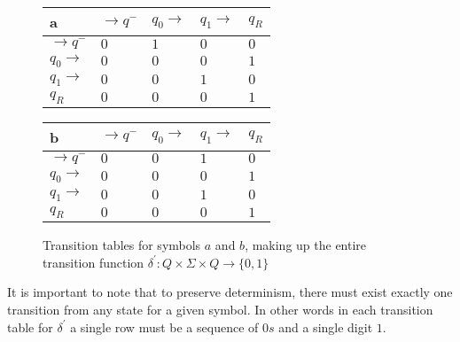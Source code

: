 \documentclass[runningheads,a4paper]{llncs}
\begin{document}
\begin{figure}
\begin{center}

	\setlength{\tabcolsep}{4pt}
	\renewcommand{\arraystretch}{1.4}

	\begin{tabular}{|P{1.0cm} || P{0.8cm} | P{0.8cm} | P{0.8cm} | P{0.8cm}|}
	\hline
	a & $\rightarrow q^-$ & $q_0 \rightarrow$ & $q_1 \rightarrow$ & $q_R$ \\
	\hline
	\hline
	$\rightarrow q^-$ 		& $0$ & $1$ & $0$ & $0$ \\
	\hline
	$q_0 \rightarrow$ 		& $0$ & $0$ & $0$ & $1$ \\
	\hline
	$q_1 \rightarrow$ 		& $0$ & $0$ & $1$ & $0$ \\
	\hline
	$q_R$  					& $0$ & $0$ & $0$ & $1$ \\
	\hline
	
	\end{tabular}
	\hspace*{1 cm}
	\begin{tabular}{|P{1.0cm} || P{0.8cm} | P{0.8cm} | P{0.8cm} | P{0.8cm}|}
	\hline
	b & $\rightarrow q^-$ & $q_0 \rightarrow$ & $q_1 \rightarrow$ & $q_R$ \\
	\hline
	\hline
	$\rightarrow q^-$ 		& $0$ & $0$ & $1$ & $0$ \\
	\hline
	$q_0 \rightarrow$ 		& $0$ & $0$ & $0$ & $1$ \\
	\hline
	$q_1 \rightarrow$ 		& $0$ & $0$ & $1$ & $0$ \\
	\hline
	$q_R$  					& $0$ & $0$ & $0$ & $1$ \\
	\hline
	
	\end{tabular}
	
\caption{Transition tables for symbols $a$ and $b$, making up the entire transition function $\delta^{'}: Q \times \Sigma \times Q \rightarrow \{0,1\}$}

\label{fig:ttable_bin}
\end{center}
\end{figure}

It is important to note that to preserve determinism, there must exist exactly one transition from any state for a given symbol. In other words in each transition table for $\delta^{'}$ a single row must be a sequence of $0s$ and a single digit $1$.




\end{document}

